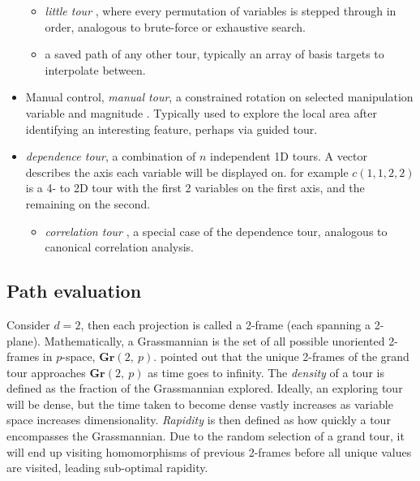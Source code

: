 \documentclass{monashthesis}
\begin{document}
\begin{itemize}
  \begin{itemize}
  \tightlist
  \item
    \emph{little tour} \autocite{mcdonald_interactive_1982}, where every
    permutation of variables is stepped through in order, analogous to
    brute-force or exhaustive search.
  \item
    a saved path of any other tour, typically an array of basis targets
    to interpolate between.
  \end{itemize}
\item
  Manual control, \emph{manual tour}, a constrained rotation on selected
  manipulation variable and magnitude \autocite{cook_manual_1997}.
  Typically used to explore the local area after identifying an
  interesting feature, perhaps via guided tour.
\item
  \emph{dependence tour}, a combination of \(n\) independent 1D tours. A
  vector describes the axis each variable will be displayed on. for
  example \(c(1, 1, 2, 2)\) is a 4- to 2D tour with the first 2
  variables on the first axis, and the remaining on the second.

  \begin{itemize}
  \tightlist
  \item
    \emph{correlation tour} \autocite{buja_data_1987}, a special case of
    the dependence tour, analogous to canonical correlation analysis.
  \end{itemize}
\end{itemize}

\subsection{Path evaluation}\label{path-evaluation}

Consider \(d=2\), then each projection is called a 2-frame (each
spanning a 2-plane). Mathematically, a Grassmannian is the set of all
possible unoriented 2-frames in \(p\)-space, \(\textbf{Gr}(2,~p)\).
\textcite{asimov_grand_1985} pointed out that the unique 2-frames of the
grand tour approaches \(\textbf{Gr}(2,~p)\) as time goes to infinity.
The \emph{density} of a tour is defined as the fraction of the
Grassmannian explored. Ideally, an exploring tour will be dense, but the
time taken to become dense vastly increases as variable space increases
dimensionality. \emph{Rapidity} is then defined as how quickly a tour
encompasses the Grassmannian. Due to the random selection of a grand
tour, it will end up visiting homomorphisms of previous 2-frames before
all unique values are visited, leading sub-optimal rapidity.
\end{document}
